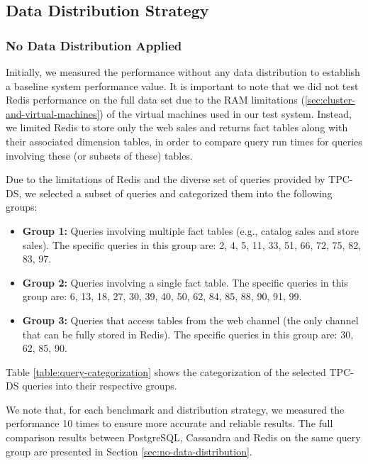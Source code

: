 \documentclass[conference]{IEEEtran}
\begin{document}
\subsection{Data Distribution Strategy}

\subsubsection{No Data Distribution Applied}

Initially, we measured the performance without any data distribution to establish a
baseline system performance value. It is important to note that we did not test
Redis performance on the full data set due to the RAM limitations
(\ref{sec:cluster-and-virtual-machines}) of the virtual machines used in our test system.
Instead, we limited Redis to store only the web sales and returns fact tables along with
their associated dimension tables, in order to compare query run times for queries
involving these (or subsets of these) tables.

Due to the limitations of Redis and the diverse set of queries provided by TPC-DS,
we selected a subset of queries and categorized them into the following groups:

\begin{itemize}
	\item \textbf{Group 1:} Queries involving multiple fact tables (e.g., catalog sales and store sales). The specific queries in this group are: 2, 4, 5, 11, 33, 51, 66, 72, 75, 82, 83, 97.
	\item \textbf{Group 2:} Queries involving a single fact table. The specific queries in this group are: 6, 13, 18, 27, 30, 39, 40, 50, 62, 84, 85, 88, 90, 91, 99.
	\item \textbf{Group 3:} Queries that access tables from the web channel (the only channel that can be fully stored in Redis). The specific queries in this group are: 30, 62, 85, 90.
\end{itemize}

Table \ref{table:query-categorization} shows the categorization of the selected TPC-DS queries into their
respective groups.

We note that, for each benchmark and distribution strategy, we measured the performance 10 times
to ensure more accurate and reliable results.
The full comparison results between PostgreSQL, Cassandra and Redis on the same query group are presented in Section \ref{sec:no-data-distribution}.\\
\end{document}
